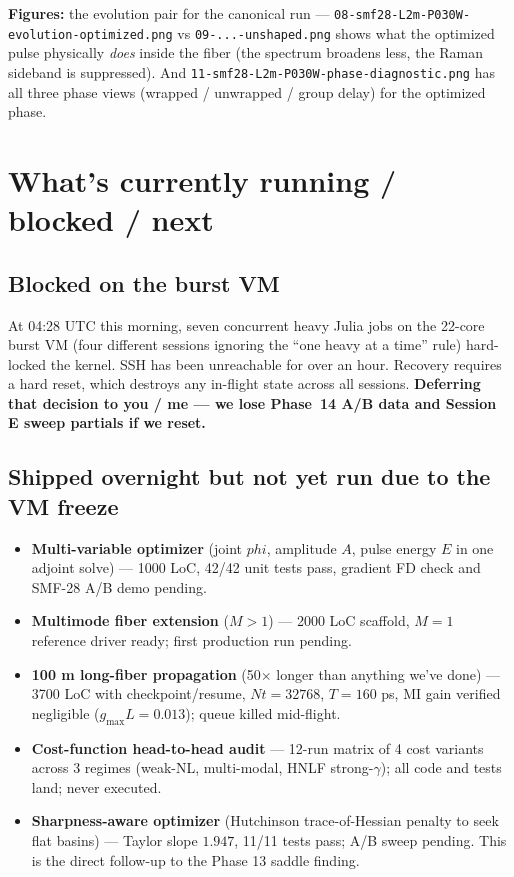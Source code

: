 \documentclass[11pt,letterpaper]{article}
\def\varphi{phi}\def\lambda{lambda}\def\mathrm#1{#1}%
\begin{document}
\textbf{Figures:} the evolution pair for the canonical run --- \texttt{08-smf28-L2m-P030W-evolution-optimized.png} vs \texttt{09-...-unshaped.png} shows what the optimized pulse physically \emph{does} inside the fiber (the spectrum broadens less, the Raman sideband is suppressed). And \texttt{11-smf28-L2m-P030W-phase-diagnostic.png} has all three phase views (wrapped / unwrapped / group delay) for the optimized phase.

\section{What's currently running / blocked / next}

\subsection*{Blocked on the burst VM}
At 04:28 UTC this morning, seven concurrent heavy Julia jobs on the 22-core burst VM (four different sessions ignoring the ``one heavy at a time'' rule) hard-locked the kernel. SSH has been unreachable for over an hour. Recovery requires a hard reset, which destroys any in-flight state across all sessions. \textbf{Deferring that decision to you / me --- we lose Phase~14 A/B data and Session E sweep partials if we reset.}

\subsection*{Shipped overnight but not yet run due to the VM freeze}
\begin{itemize}[leftmargin=*]
  \item \textbf{Multi-variable optimizer} (joint $\varphi$, amplitude $A$, pulse energy $E$ in one adjoint solve) --- 1000 LoC, 42/42 unit tests pass, gradient FD check and SMF-28 A/B demo pending.
  \item \textbf{Multimode fiber extension} ($M > 1$) --- 2000 LoC scaffold, $M=1$ reference driver ready; first production run pending.
  \item \textbf{100 m long-fiber propagation} (50$\times$ longer than anything we've done) --- 3700 LoC with checkpoint/resume, $\mathrm{Nt}=32768$, $T=160$ ps, MI gain verified negligible ($g_{\max} L = 0.013$); queue killed mid-flight.
  \item \textbf{Cost-function head-to-head audit} --- 12-run matrix of 4 cost variants across 3 regimes (weak-NL, multi-modal, HNLF strong-$\gamma$); all code and tests land; never executed.
  \item \textbf{Sharpness-aware optimizer} (Hutchinson trace-of-Hessian penalty to seek flat basins) --- Taylor slope $1.947$, 11/11 tests pass; A/B sweep pending. This is the direct follow-up to the Phase 13 saddle finding.
\end{itemize}
\end{document}
